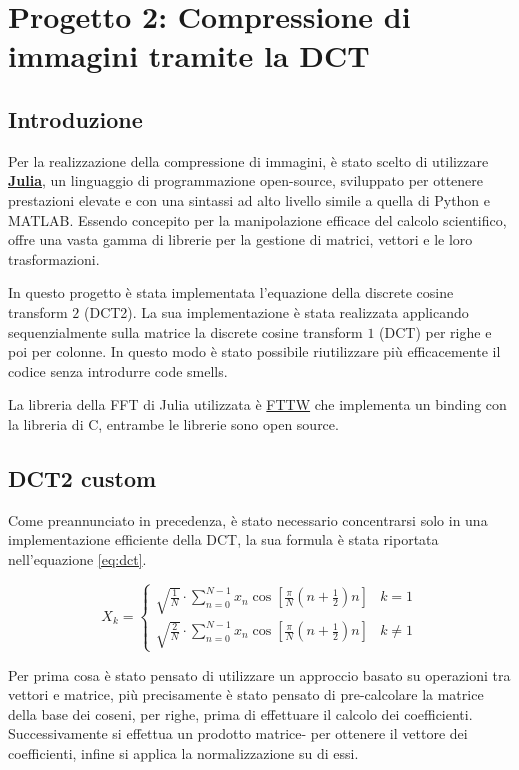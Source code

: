 \chapter{Progetto 2: Compressione di immagini tramite la DCT}

\section{Introduzione}
Per la realizzazione della compressione di immagini, è stato scelto di utilizzare 
\href{https://julialang.org/}{\textbf{Julia}}, un linguaggio di programmazione open-source, 
sviluppato per ottenere prestazioni elevate e con una sintassi ad alto livello simile 
a quella di Python e MATLAB. Essendo concepito
per la manipolazione efficace del calcolo scientifico, offre una vasta gamma di
librerie per la gestione di matrici, vettori e le loro trasformazioni.

In questo progetto è stata implementata l'equazione della discrete cosine transform $2$ (DCT2).
La sua implementazione è stata realizzata applicando sequenzialmente sulla matrice
la discrete cosine transform $1$ (DCT) per righe e poi per colonne. In questo modo
è stato possibile riutilizzare più efficacemente il codice senza introdurre code
smells.

La libreria della FFT di Julia utilizzata è \href{https://github.com/JuliaMath/FFTW.jl}{FTTW}
che implementa un binding con la libreria di C, entrambe le librerie sono open source.

\section{DCT2 custom}
Come preannunciato in precedenza, è stato necessario concentrarsi solo in una implementazione
efficiente della DCT, la sua formula è stata riportata nell'equazione \ref{eq:dct}.

\begin{equation}
    X_k = \begin{cases}
        \sqrt{\frac{1}{N}}\cdot \sum_{n=0}^{N-1} x_n \cos\left[\frac{\pi}{N}\left(n + \frac{1}{2}\right) n \right] & k=1     \\
        \sqrt{\frac{2}{N}}\cdot\sum _{n=0}^{N-1}x_{n}\cos \left[\frac{\pi}{N}\left(n+\frac{1}{2}\right)n\right]    & k \ne 1
    \end{cases}
    \label{eq:dct}
\end{equation}

Per prima cosa è stato pensato di utilizzare un approccio basato su operazioni
tra vettori e matrice, più precisamente è stato pensato di pre-calcolare la matrice
della base dei coseni, per righe, prima di effettuare il calcolo dei coefficienti.
Successivamente si effettua un prodotto matrice- per ottenere il vettore
dei coefficienti, infine si applica la normalizzazione su di essi.

